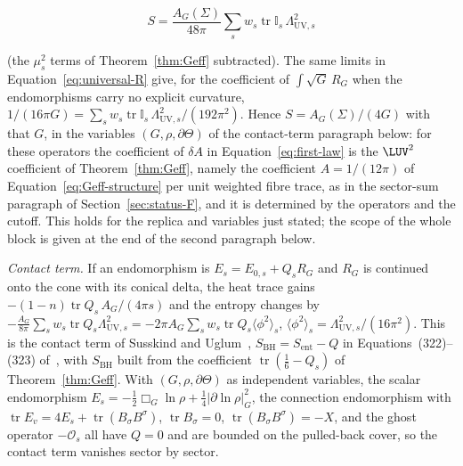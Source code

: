 \[

  S=\frac{A_G(\Sigma)}{48\pi}\sum_sw_s\operatorname{tr}\mathbb I_s\,\Lambda_{\mathrm{UV},s}^2

\]

(the \(\mu_s^2\) terms of Theorem~\ref{thm:Geff} subtracted). The same limits in Equation~\eqref{eq:universal-R} give, for the coefficient of \(\int\sqrt{G}\,R_G\) when the endomorphisms carry no explicit curvature, \(1/(16\pi G)=\sum_sw_s\operatorname{tr}\mathbb I_s\,\Lambda_{\mathrm{UV},s}^2/(192\pi^2)\). Hence \(S=A_G(\Sigma)/(4G)\) with that \(G\), in the variables \((G,\rho,\partial\Theta)\) of the contact-term paragraph below: for these operators the coefficient of \(\delta A\) in Equation~\eqref{eq:first-law} is the \(\LUV^2\) coefficient of Theorem~\ref{thm:Geff}, namely the coefficient \(A=1/(12\pi)\) of Equation~\eqref{eq:Geff-structure} per unit weighted fibre trace, as in the sector-sum paragraph of Section~\ref{sec:status-F}, and it is determined by the operators and the cutoff. This holds for the replica and variables just stated; the scope of the whole block is given at the end of the second paragraph below.



\emph{Contact term.} If an endomorphism is \(E_s=E_{0,s}+Q_sR_G\) and \(R_G\) is continued onto the cone with its conical delta, the heat trace gains \(-(1-n)\operatorname{tr}Q_s\,A_G/(4\pi s)\) and the entropy changes by \(-\tfrac{A_G}{8\pi}\sum_sw_s\operatorname{tr}Q_s\Lambda_{\mathrm{UV},s}^2=-2\pi A_G\sum_sw_s\operatorname{tr}Q_s\langle\phi^2\rangle_s\), \(\langle\phi^2\rangle_s=\Lambda_{\mathrm{UV},s}^2/(16\pi^2)\). This is the contact term of Susskind and Uglum~\cite{SusskindUglum1994}, \(S_{\mathrm{BH}}=S_{\mathrm{ent}}-Q\) in Equations~(322)--(323) of~\cite{Solodukhin2011}, with \(S_{\mathrm{BH}}\) built from the coefficient \(\operatorname{tr}(\tfrac16-Q_s)\) of Theorem~\ref{thm:Geff}. With \((G,\rho,\partial\Theta)\) as independent variables, the scalar endomorphism \(E_s=-\tfrac12\Box_G\ln\rho+\tfrac14|\partial\ln\rho|_G^2\), the connection endomorphism with \(\operatorname{tr}E_v=4E_s+\operatorname{tr}(B_\sigma B^\sigma)\), \(\operatorname{tr}B_\sigma=0\), \(\operatorname{tr}(B_\sigma B^\sigma)=-X\), and the ghost operator \(-\mathcal O_s\) all have \(Q=0\) and are bounded on the pulled-back cover, so the contact term vanishes sector by sector.



